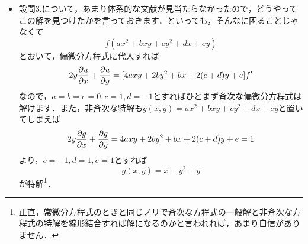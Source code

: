 \documentclass[a4paper,pdflatex,ja=standard]{bxjsarticle}
\begin{document}
\begin{itemize}
  \item 
  設問3.について，あまり体系的な文献が見当たらなかったので，どうやってこの解を見つけたかを言っておきます．といっても，そんなに困ることじゃなくて
  \begin{equation}
    f(ax^2+bxy+cy^2+dx+ey)
  \end{equation}
  とおいて，偏微分方程式に代入すれば
  \begin{equation}
    2y\pdv{u}{x}+\pdv{u}{y}
    =
    [4axy+2by^2+bx+2(c+d)y+e]f'
  \end{equation}
  なので，$a=b=e=0,c=1,d=-1$とすればひとまず斉次な偏微分方程式は解けます．また，非斉次な特解も$g(x,y)=ax^2+bxy+cy^2+dx+ey$と置いてしまえば
  \begin{equation}
    2y\pdv{g}{x}+\pdv{g}{y}
    =
    4axy+2by^2+bx+2(c+d)y+e=1
  \end{equation}
  より，$c=-1,d=1,e=1$とすれば
  \begin{equation}
    g(x,y)
    =
    x-y^2+y
  \end{equation}
  が特解\footnote{正直，常微分方程式のときと同じノリで斉次な方程式の一般解と非斉次な方程式の特解を線形結合すれば解になるのかと言われれば，あまり自信がありません．}．


\end{itemize}
\end{document}
